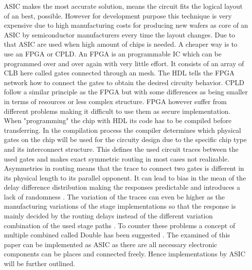 \ac{ASIC} makes the most accurate solution, means the circuit fits the logical layout of an \apuf best, possible.
However for development purpose this technique is very expensive due to high manufacturing costs for producing new wafers as core of an \ac{ASIC} by semiconductor manufacturers every time the layout changes. %
Due to that \ac{ASIC} are used when high amount of chips is needed.
A cheaper way is to use an \ac{FPGA} or \ac{CPLD}. 
An \ac{FPGA} is an programmable \ac{IC} which can be programmed over and over again with very little effort.
It consists of an array of \ac{CLB} here called gates connected through an mesh.
The \ac{HDL} tells the \ac{FPGA} network how to connect the gates to obtain the desired circuity behavior.
\ac{CPLD} follow a similar principle as the \ac{FPGA} but with some differences as being smaller in terms of resources or less complex structure.
\ac{FPGA} however suffer from different problems making it difficult to use them as secure \apuf implementation.
When "programming" the chip with \ac{HDL} its code has to be compiled before transferring.
In the compilation process the compiler determines which physical gates on the chip will be used for the circuity design due to the specific chip type and its interconnect structure.
This defines the used circuit traces between the used gates and makes exact symmetric routing in most cases not realizable.
Asymmetries in routing means that the trace to connect two gates is different in its physical length to its parallel opponent.
It can lead to bias in the mean of the delay difference distribution making the responses predictable and introduces a lack of randomness \cite{Majzoobi2010FPGALines} \cite{Morozov2010AnFPGA}.
The variation of the traces can even be higher as the manufacturing variations of the stage implementations so that the response is mainly decided by the routing delays instead of the different variation combination of the used stage paths \cite{Majzoobi2009TechniquesPUFs}.
To counter these problems a concept of multiple combined \apuf called Double \apuf has been suggested \cite{Machida2015ImplementationFPGA} \cite{Machida2015AFPGA}.
The examined \apufs of this paper can be implemented as \ac{ASIC} as there are all necessary electronic components can be places and connected freely.
Hence \apuf implementations by \ac{ASIC} will be further outlined.

